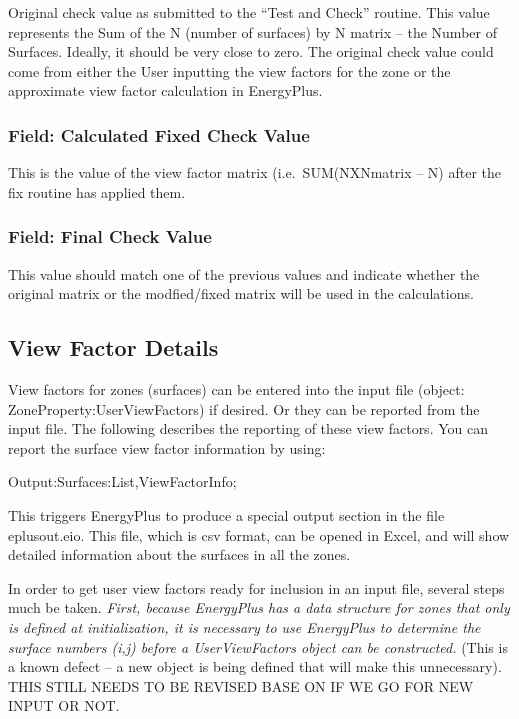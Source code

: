 Original check value as submitted to the ``Test and Check'' routine. This value represents the Sum of the N (number of surfaces) by N matrix -- the Number of Surfaces. Ideally, it should be very close to zero. The original check value could come from either the User inputting the view factors for the zone or the approximate view factor calculation in EnergyPlus.

\subsubsection{Field: Calculated Fixed Check Value}\label{field-calculated-fixed-check-value}

This is the value of the view factor matrix (i.e.~SUM(NXNmatrix -- N) after the fix routine has applied them.

\subsubsection{Field: Final Check Value}\label{field-final-check-value}

This value should match one of the previous values and indicate whether the original matrix or the modfied/fixed matrix will be used in the calculations.

\subsection{View Factor Details}\label{view-factor-details}

View factors for zones (surfaces) can be entered into the input file (object: ZoneProperty:UserViewFactors) if desired. Or they can be reported from the input file. The following describes the reporting of these view factors. You can report the surface view factor information by using:

Output:Surfaces:List,ViewFactorInfo;

This triggers EnergyPlus to produce a special output section in the file eplusout.eio. This file, which is csv format, can be opened in Excel, and will show detailed information about the surfaces in all the zones.

In order to get user view factors ready for inclusion in an input file, several steps much be taken. \emph{First, because EnergyPlus has a data structure for zones that only is defined at initialization, it is necessary to use EnergyPlus to determine the surface numbers (i,j) before a UserViewFactors object can be constructed.} (This is a known defect -- a new object is being defined that will make this unnecessary). THIS STILL NEEDS TO BE REVISED BASE ON IF WE GO FOR NEW INPUT OR NOT.

